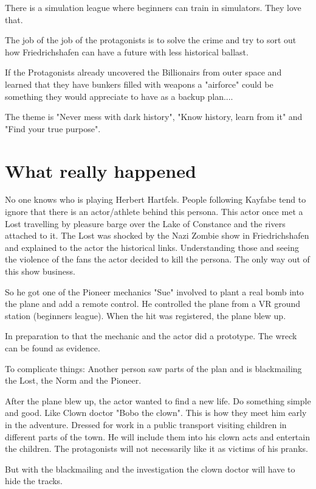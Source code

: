 There is a simulation league where beginners can train in simulators. They love that.

The job of the job of the protagonists is to solve the crime and try to sort out how Friedrichshafen can have a future with less historical ballast.

If the Protagonists already uncovered the Billionairs from outer space and learned that they have bunkers filled with weapons a "airforce" could be something they would appreciate to have as a backup plan....

The theme is "Never mess with dark history", "Know history, learn from it" and "Find your true purpose".

\section{What really happened}

No one knows who is playing Herbert Hartfels. People following Kayfabe tend to ignore that there is an actor/athlete behind this persona.
This actor once met a Lost travelling by pleasure barge over the Lake of Constance and the rivers attached to it.
The Lost was shocked by the Nazi Zombie show in Friedrichshafen and explained to the actor the historical links.
Understanding those and seeing the violence of the fans the actor decided to kill the persona. The only way out of this show business.

So he got one of the Pioneer mechanics "Sue" involved to plant a real bomb into the plane and add a remote control. He controlled the plane from a VR ground station (beginners league).
When the hit was registered, the plane blew up.

In preparation to that the mechanic and the actor did a prototype. The wreck can be found as evidence.

To complicate things: Another person saw parts of the plan and is blackmailing the Lost, the Norm and the Pioneer.

After the plane blew up, the actor wanted to find a new life. Do something simple and good. Like Clown doctor "Bobo the clown". This is how they meet him early in the adventure. Dressed for work in a public transport visiting children in different parts of the town. He will include them into his clown acts and entertain the children. The protagonists will not necessarily like it as victims of his pranks.

But with the blackmailing and the investigation the clown doctor will have to hide the tracks.

